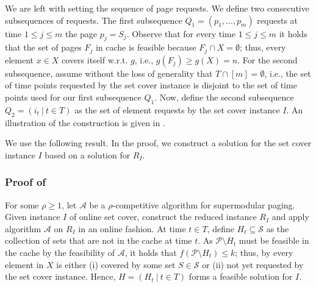 \documentclass[11pt]{article}
\newcommand{\cA}{{\mathcal{A}}}
\newcommand{\cP}{{\mathcal{P}}}
\newcommand{\cS}{{\mathcal{S}}}
\newtheorem{lemma}[thm]{Lemma}
\begin{document}

We are left with setting the sequence of page requests. We define two consecutive subsequences of requests. The first subsequence $Q_1 = (p_1,\ldots, p_m)$ requests at time $1 \leq j \leq m$ the page $p_j = S_j$. Observe that for every time $1 \leq j \leq m$ it holds that the set of pages $F_j$ in cache is feasible because $F_j \cap X = \emptyset$; thus, every element $x \in X$ covers itself w.r.t. $g$, i.e., $g(F_j) \geq g(X) = n$. 
For the second subsequence, assume without the loss of generality that $T \cap [m] = \emptyset$, i.e., the set of time points requested by the set cover instance is disjoint to the set of time points used for our first subsequence $Q_1$. Now, define the second subsequence $Q_2 = \left(i_t  ~|~ t \in T\right)$ as the set of element requests by the set cover instance $I$. %
An illustration of the construction is given in . 


We use the following result. In the proof, we construct a solution for the set cover instance $I$ based on a solution for $R_I$.


\subsubsection*{Proof of }

For some $\rho \geq 1$,	let $\cA$ be a $\rho$-competitive algorithm for \textnormal{supermodular paging}. Given instance $I$ of online set cover, construct the reduced instance $R_I$ and apply algorithm $\cA$ on $R_I$ in an online fashion. At time $t \in T$, define $H_t \subseteq \cS$ as the collection of sets that are not in the cache at time $t$. As $\cP \setminus H_t$ must be feasible in the cache by the feasibility of $\cA$, it holds that $f(\cP \setminus H_t) \leq k$; thus, by  every element in $X$ is either (i) covered by some set $S \in \cS$ or (ii) not yet requested by the set cover instance. Hence, $H = (H_t~|~t \in T)$ forms a feasible solution for $I$.  
	
\end{document}
